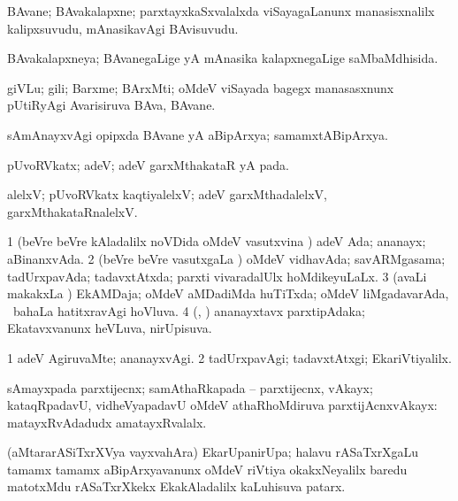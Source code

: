 \bentry
{}
\gl{\nA}
\bmng
BAvane; BAvakalapxne; parxtayxkaSxvalalxda viSayagaLanunx manasisxnalilx kalipxsuvudu, mAnasikavAgi BAvisuvudu. 
\emng
\eentry

\bentry
{}
\gl{\gu}
\bmng
BAvakalapxneya; BAvanegaLige yA mAnasika kalapxnegaLige saMbaMdhisida. 
\emng
\eentry

\bentry
{}
\gl{\nA}
\bmng
giVLu; gili; Barxme; BArxMti; oMdeV viSayada bagegx manasasxnunx pUtiRyAgi Avarisiruva BAva, BAvane. 
\emng
\eentry

\bentry
{}
\gl{\nA}
\bmng
sAmAnayxvAgi opipxda BAvane yA aBipArxya; samamxtABipArxya. 
\emng
\eentry

\bentry
{}
\gl{\nA}
\expl{\Latin}
\bmng
pUvoRVkatx; adeV; adeV garxMthakataR yA pada. 
\emng
\eentry

\bentry
{}
\gl{\kirxvi}
\expl{\Latin }
\bmng
alelxV; pUvoRVkatx kaqtiyalelxV; adeV garxMthadalelxV, garxMthakataRnalelxV. 
\emng
\eentry

\bentry
{}
\gl{\gu}
\bmng
\bnum
\num{1} (beVre beVre kAladalilx noVDida oMdeV vasutxvina \vi) adeV Ada; ananayx; aBinanxvAda. 
\num{2} (beVre beVre vasutxgaLa \vi) oMdeV vidhavAda; savARMgasama; tadUrxpavAda; tadavxtAtxda; parxti vivaradalUlx hoMdikeyuLaLx. 
\num{3} (avaLi makakxLa \vi) EkAMDaja; oMdeV aMDadiMda huTiTxda; oMdeV liMgadavarAda, \sA\ bahaLa hatitxravAgi hoVluva. 
\num{4} (\takaR, \ga) ananayxtavx parxtipAdaka; Ekatavxvanunx heVLuva, nirUpisuva. 
\enum
\emng
\eentry

\bentry
{}
\gl{\kirxvi}
\bmng
\bnum
\num{1} adeV AgiruvaMte; ananayxvAgi. 
\num{2} tadUrxpavAgi; tadavxtAtxgi; EkariVtiyalilx. 
\enum
\emng
\eentry

\bentry
{}
\gl{\nA}
\bmng
sAmayxpada parxtijecnx; samAthaRkapada -- parxtijecnx, vAkayx; kataqRpadavU, vidheVyapadavU oMdeV athaRhoMdiruva parxtijAcnxvAkayx:  matayxRvAdadudx amatayxRvalalx. 
\emng
\eentry

\bentry
{}
\gl{\nA}
\bmng
(aMtararASiTxrXVya vayxvahAra) EkarUpanirUpa; halavu rASaTxrXgaLu tamamx tamamx aBipArxyavanunx oMdeV riVtiya okakxNeyalilx baredu matotxMdu rASaTxrXkekx EkakAladalilx kaLuhisuva patarx. 
\emng
\eentry

